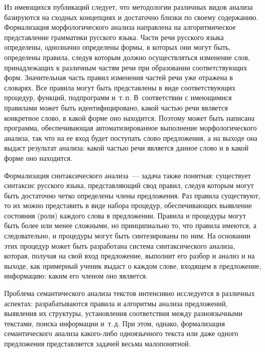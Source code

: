 \begin{multicols}{2}
   Из имеющихся публикаций следует, что методологии различных видов 
анализа базируются на сходных концепциях и достаточно близки по своему 
содержанию. Формализация морфологического анализа направлена на 
алгоритмическое пред\-став\-ле\-ние грамматики русского языка. Час\-ти речи 
русского языка определены, однозначно определены формы, в которых они 
могут быть, определены правила, следуя которым должно осуществляться 
изменение слов, принадлежащих к различным час\-тям речи при образовании 
соответствующих форм. Значительная часть правил изменения частей речи 
уже отражена в словарях. Все правила могут быть представлены в виде 
соответствующих процедур, функций, подпрограмм и~т.\,п. В~соответствии 
с имеющимися правилами может быть идентифицировано, какой частью 
речи является конкретное слово, в какой форме оно находится. Поэтому 
может быть написана программа, обеспечивающая автоматизированное 
выполнение морфологического анализа, так что на ее вход будет поступать 
слово предложения, а на выходе она выдаст результат анализа: какой частью 
речи является данное слово и в какой форме оно находится. 
   
   Формализация синтаксического анализа~--- задача также понятная: 
существует синтаксис русского языка, представляющий свод правил, следуя 
которым могут быть достаточно четко определены члены предложения. Раз 
правила существуют, то их можно представить в виде набора процедур, 
обеспечивающих выявление состояния (роли) каждого слова в предложении. 
Правила и процедуры могут быть более или менее сложными, но 
принципиально то, что правила имеются, а следовательно, и процедуры 
могут быть синтезированы по ним. На основании этих процедур может быть 
разработана система синтаксического анализа, которая, получая на свой вход 
предложение, выполнит его разбор и анализ и на выходе, как примерный 
ученик выдаст о каждом слове, входящем в предложение, информацию: 
каким его членом оно является. 
   
   Проблема семантического анализа текстов интенсивно исследуется в 
различных аспектах: разрабатываются правила и алгоритмы анализа 
предложений, выявления их структуры, установления соответствия между 
разноязычными текстами, поиска информации и~т.\,д. При этом, однако, 
формализация семантического анализа ка\-ко\-го-ли\-бо одноязычного текста 
или даже одного предложения представляется задачей весьма малопонятной. 
   

\end{multicols}
